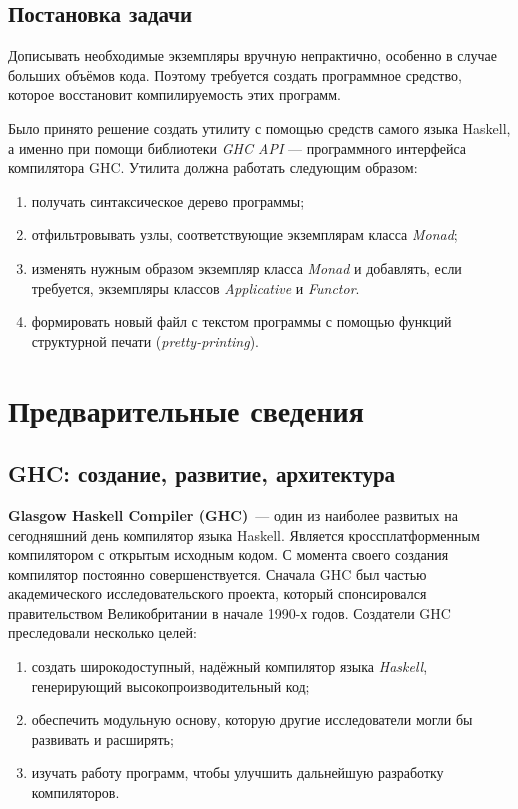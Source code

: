 \section*{Постановка задачи}
Дописывать необходимые экземпляры вручную непрактично, особенно в случае больших объёмов кода. Поэтому требуется создать программное средство, которое восстановит компилируемость этих программ.

Было принято решение создать утилиту с помощью средств самого языка Haskell, а именно при помощи библиотеки \textit{GHC API} --- программного интерфейса компилятора GHC. Утилита должна работать следующим образом:
\begin{enumerate}[1)]
\item получать синтаксическое дерево программы;
\item отфильтровывать узлы, соответствующие экземплярам класса \textit{Monad};
\item изменять нужным образом экземпляр класса \textit{Monad} и добавлять, если требуется, экземпляры классов \textit{Applicative} и \textit{Functor}.
\item формировать новый файл с текстом программы с помощью функций структурной печати (\textit{pretty-printing}).
\end{enumerate}


\newpage
\chapter{Предварительные сведения}
\label{sec:prelim}

\section{GHC: создание, развитие, архитектура}
\textbf{Glasgow Haskell Compiler (GHC)}~--- один из наиболее развитых на сегодняшний день компилятор языка Haskell. Является кроссплатформенным компилятором с открытым исходным кодом. С момента своего создания компилятор постоянно совершенствуется. Сначала GHC был частью академического исследовательского проекта, который спонсировался правительством Великобритании в начале 1990-х годов. Создатели GHC преследовали несколько целей:
\begin{enumerate}[1)]
\item создать широкодоступный, надёжный компилятор языка \textit{Haskell}, генерирующий высокопроизводительный код;
\item обеспечить модульную основу, которую другие исследователи могли бы развивать и расширять;
\item изучать работу программ, чтобы улучшить дальнейшую разработку компиляторов.
\end{enumerate}

